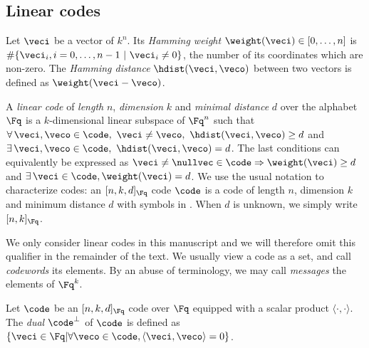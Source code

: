 

\subsection{Linear codes}

\begin{defi}
Let $\veci$ be a vector of $k^n$. Its \emph{Hamming weight} $\weight(\veci) \in [0,\ldots,n]$ is $\#\{\veci_i, i = 0,\ldots,n-1~|~ \veci_i \neq 0\}$,
the number of its coordinates which are non-zero.
The \emph{Hamming distance} $\hdist(\veci,\veco)$ between two vectors is defined as $\weight(\veci - \veco)$.
\end{defi}


\begin{defi}
\label{def:lincode}
A \emph{linear code} of \emph{length} $n$, \emph{dimension} $k$ and \emph{minimal distance} $d$ over the alphabet $\Fq$ is a $k$-dimensional linear subspace of $\Fq^n$ such that
$\forall\,\veci, \veco \in \code,~ \veci \neq \veco,~\hdist(\veci, \veco) \geq d$
and $\exists\,\veci, \veco \in \code,~  \hdist(\veci, \veco) = d$.
The last conditions can equivalently be expressed as $\veci \neq \nullvec \in \code \Rightarrow \weight(\veci) \geq d$ and $\exists\,\veci \in \code, \weight(\veci) = d$.
We use the usual notation to characterize codes: an $[n, k, d]_{\Fq}$ code $\code$ is a code of length $n$, dimension $k$ and minimum distance $d$
with symbols in \Fq. When $d$ is unknown, we simply write $[n, k]_{\Fq}$.
\end{defi}

We only consider linear codes in this manuscript and we will therefore omit this qualifier in the remainder of the text. 
We usually view a code as a set, and call \emph{codewords} its elements. By an abuse of terminology, we may call \emph{messages} the elements of $\Fq^k$.

\begin{defi}
Let $\code$ be an $[n, k, d]_{\Fq}$ code over $\Fq$ equipped with a scalar product $\langle\cdot,\cdot\rangle$. The \emph{dual}
$\code^\bot$ of $\code$ is defined as $\{\veci \in \Fq | \forall \veco \in \code, \langle\veci,\veco\rangle = 0\}$.
\end{defi}

